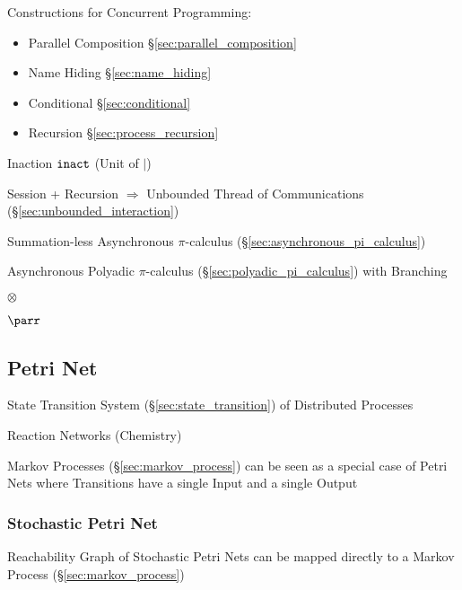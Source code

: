 Constructions for Concurrent Programming:
\cite{honda-vasconcelos-kubo98}
\begin{itemize}
  \item Parallel Composition \S\ref{sec:parallel_composition}
  \item Name Hiding \S\ref{sec:name_hiding}
  \item Conditional \S\ref{sec:conditional}
  \item Recursion \S\ref{sec:process_recursion}
\end{itemize}

Inaction $\mathtt{inact}$ (Unit of $|$)


Session + Recursion $\Rightarrow$ Unbounded Thread of Communications
(\S\ref{sec:unbounded_interaction}) \cite{honda-vasconcelos-kubo98}

Summation-less Asynchronous $\pi$-calculus
(\S\ref{sec:asynchronous_pi_calculus}) \cite{honda-vasconcelos-kubo98}

Asynchronous Polyadic $\pi$-calculus
(\S\ref{sec:polyadic_pi_calculus}) with Branching
\cite{honda-vasconcelos-kubo98}


$\otimes$

$\parr$



\subsection{Petri Net}\label{sec:petri_net}

State Transition System (\S\ref{sec:state_transition}) of Distributed
Processes

Reaction Networks (Chemistry)

Markov Processes (\S\ref{sec:markov_process}) can be seen as a special
case of Petri Nets where Transitions have a single Input and a single
Output



\subsubsection{Stochastic Petri Net}\label{sec:stochastic_petri_net}

Reachability Graph of Stochastic Petri Nets can be mapped directly to
a Markov Process (\S\ref{sec:markov_process})




